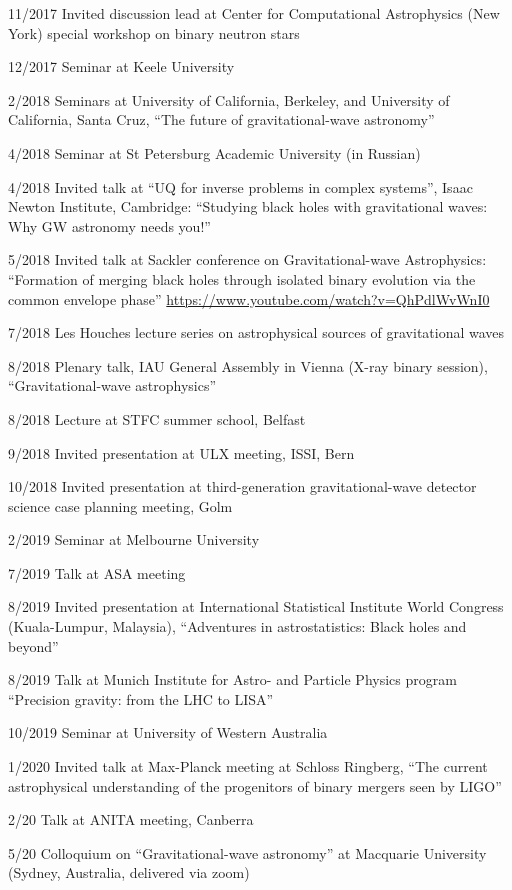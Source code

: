 \documentclass[margin,line]{res}
\begin{document}
\begin{resume}
11/2017 	Invited discussion lead at Center for Computational Astrophysics (New York) special workshop on binary neutron stars

12/2017 	Seminar at Keele University

2/2018  	Seminars at University of California, Berkeley, and University of California, Santa Cruz, ``The future of gravitational-wave astronomy''

4/2018	Seminar at St Petersburg Academic University (in Russian)

4/2018	Invited talk at ``UQ for inverse problems in complex systems'', Isaac Newton Institute, Cambridge: ``Studying black holes with gravitational waves: Why GW astronomy needs you!''

5/2018 Invited talk at Sackler conference on Gravitational-wave Astrophysics: ``Formation of merging black holes through isolated binary evolution via the common envelope phase'' \url{https://www.youtube.com/watch?v=QhPdlWvWnI0}

7/2018 Les Houches lecture series on astrophysical sources of gravitational waves

8/2018 Plenary talk, IAU General Assembly in Vienna (X-ray binary session), ``Gravitational-wave astrophysics''

8/2018 Lecture at STFC summer school, Belfast

9/2018 Invited presentation at ULX meeting, ISSI, Bern

10/2018 Invited presentation at third-generation gravitational-wave detector science case planning meeting, Golm

2/2019 Seminar at Melbourne University

7/2019 Talk at ASA meeting

8/2019 Invited presentation at International Statistical Institute World Congress (Kuala-Lumpur, Malaysia), ``Adventures in astrostatistics: Black holes and beyond''

8/2019 Talk at Munich Institute for Astro- and Particle Physics program ``Precision gravity: from the LHC to LISA''

10/2019 Seminar at University of Western Australia

1/2020 Invited talk at Max-Planck meeting at Schloss Ringberg, ``The current astrophysical understanding of the progenitors of binary mergers seen by LIGO''

2/20 Talk at ANITA meeting, Canberra

5/20 Colloquium on ``Gravitational-wave astronomy'' at Macquarie University (Sydney, Australia, delivered via zoom)


\end{resume}
\end{document}
